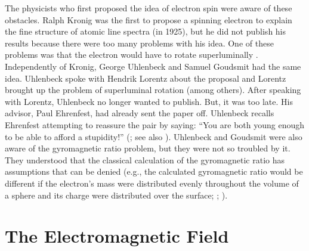 \documentclass[onecolumn,secnumarabic,amsmath,amssymb,balancelastpage,nofootinbib]{article}
\begin{document}
The physicists who first proposed the idea of electron spin were aware of these obstacles.  Ralph Kronig was the first to propose a spinning electron to explain the fine structure of atomic line spectra (in 1925), but he did not publish his results because there were too many problems with his idea.  One of these problems was that the electron would have to rotate superluminally \citep[pg.\ 35]{tomonaga}.  Independently of Kronig, George Uhlenbeck and Samuel Goudsmit had the same idea.  Uhlenbeck spoke with Hendrik Lorentz about the proposal and Lorentz brought up the problem of superluminal rotation (among others).  After speaking with Lorentz, Uhlenbeck no longer wanted to publish.  But, it was too late.  His advisor, Paul Ehrenfest, had already sent the paper off.  Uhlenbeck recalls Ehrenfest attempting to reassure the pair by saying: ``You are both young enough to be able to afford a stupidity!'' (\citealp[pg.\ 47]{uhlenbeck}; see also \citealp{goudsmit}).  Uhlenbeck and Goudsmit were also aware of the gyromagnetic ratio problem, but they were not so troubled by it.  They understood that the classical calculation of the gyromagnetic ratio has assumptions that can be denied (e.g., the calculated gyromagnetic ratio would be different if the electron's mass were distributed evenly throughout the volume of a sphere and its charge were distributed over the surface; \citealp[pg.\ 47]{uhlenbeck}; \citealp[pg.\ 39]{pais1989}).

\section{The Electromagnetic Field}
\end{document}
